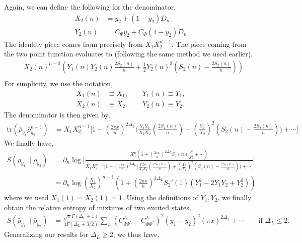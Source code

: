 \documentclass[11pt]{article}
\newcommand{\p}{\partial}
\newcommand{\lb}{\left(}
\newcommand{\rb}{\right)}
\begin{document}
Again, we can define the following for the denominator,
\begin{align}
    X_2(n) &= y_2 + (1-y_2)D_n \\
    Y_2(n) &=  C_\Psi y_2 + C_\Phi(1-y_2)D_n 
\end{align}
The identity piece comes from precisely from $X_1 X_2^{n-1}$. The piece coming from the two point function evaluates to (following the same method we used earlier),
\begin{align}
    &X_2(n)^{n-2}\lb Y_1(n)Y_2 (n)\frac{2S_2(n)}{n} + \frac{1}{2}Y_2(n)^2 \lb S_2(n) - \frac{2S_2(n)}{n}\rb \rb \\
\end{align}
For simplicity, we use the notation,
\begin{align}
    X_1(n) &\equiv X_1 ,\qquad Y_1(n) \equiv Y_1 ,\\
    X_2(n)&\equiv X_2, \qquad Y_2(n) \equiv Y_2.
\end{align}
The denominator is then given by,
\begin{align}
    \text{tr}\lb \bar{\rho}_{y_1}\bar{\rho}_{y_2}^{n-1}  \rb &= X_1 X_2^{n-1} \Bigg[ 1+  \lb\frac{2\pi x}{n}\rb^{2\Delta_L} \Bigg(\frac{Y_1Y_2}{X_1X_2}\lb\frac{2S_2(n)}{n}\rb  + \lb\frac{Y_2}{X_2}\rb^2 \lb S_2(n)-\frac{2S_2(n)}{n}\rb\Bigg)+\cdots\Bigg]
\end{align}
We finally have,
\begin{align}
    S(\bar{\rho}_{y_1} \| \bar{\rho}_{y_2} ) &= \p_n \log \Bigg[ \frac{X_1^n\lb1 + \lb\frac{2\pi x}{n}\rb^{2\Delta_L} S_2(n) \frac{Y_1^2}{X_1^2} + \cdots \rb}{X_1 X_2^{n-1} \Bigg[ 1+  \lb\frac{2\pi x}{n}\rb^{2\Delta_L} \Bigg(\frac{Y_1Y_2}{X_1X_2}\lb\frac{2S_2(n)}{n}\rb + \lb\frac{Y_2}{X_2}\rb^2 \lb S_2(n)-\frac{2S_2(n)}{n}\rb\Bigg)+\cdots\Bigg]}\Bigg] \\
    &= \p_n \log \lb \frac{X_1}{X_2}\rb^{n-1} \lb 1+ \lb\frac{2\pi x}{n}\rb^{2\Delta_L} S_2'(1) \lb Y_1^2 -2Y_1Y_2 +Y_2^2\rb\rb
\end{align}
where we used $X_1(1) = X_2(1)= 1$. Using the definitions of $Y_1,Y_2$, we finally obtain the relative entropy of mixtures of two excited states,
\begin{align}
    S(\bar{\rho}_{y_1} \| \bar{\rho}_{y_2} ) &= \frac{\sqrt{\pi} \Gamma(\Delta_L + 1)}{4\Gamma(\Delta_L + 3/2)}\sum_L (C_{\Psi \Psi^*}^L - C_{\Phi \Phi^*}^L)^2(y_1-y_2)^2 (\pi x)^{2\Delta_L} + \cdots \qquad \text{if }\Delta_L \leq 2.
\end{align}
Generalizing our results for $\Delta_L \geq 2$, we thus have,
\end{document}
